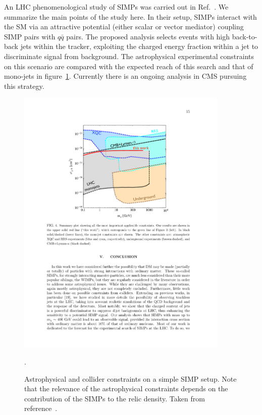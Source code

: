 An LHC phenomenological study of SIMPs was carried out in Ref.~\cite{Daci:2015hca}. We summarize the main points of the study here. In their setup, SIMPs interact with the SM via an attractive potential (either scalar or vector mediator) coupling SIMP pairs with $q\bar{q}$ pairs. The proposed analysis selects events with high \pT back-to-back jets within the tracker, exploiting the charged energy fraction within a jet to discriminate signal from background.  The astrophysical experimental constraints on this scenario are compared with the expected reach of this search and that of mono-jets in figure~\ref{fig:simps}. Currently there is an ongoing analysis in CMS pursuing this strategy.

\begin{figure}[t]
\centering
\includegraphics[width=0.9\textwidth]{plots/simps_constraints.pdf}
\caption{Astrophysical and collider constraints on a simple SIMP setup. Note that the relevance of the astrophysical constraints depends on the contribution of the SIMPs to the relic density. Taken from reference~\cite{Daci:2015hca}.}
  \label{fig:simps}.
\end{figure}

